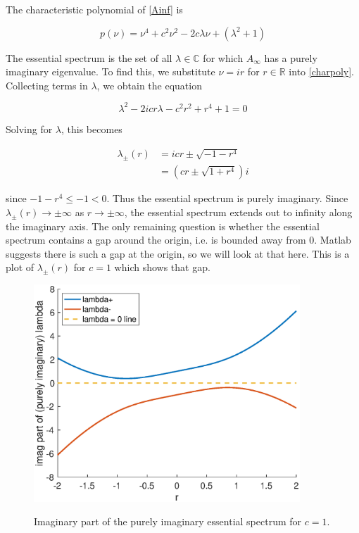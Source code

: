 \documentclass[12pt]{article}
\def\R{{\mathbb R}}
\def\C{{\mathbb C}}
\begin{document}
The characteristic polynomial of \eqref{Ainf} is

\begin{equation}\label{charpoly}
p(\nu) = \nu^4 + c^2 \nu^2 - 2 c \lambda \nu + (\lambda^2 + 1) 
\end{equation} 

The essential spectrum is the set of all $\lambda \in \C$ for which $A_\infty$ has a purely imaginary eigenvalue. To find this, we substitute $\nu = i r$ for $r \in \R$ into \eqref{charpoly}. Collecting terms in $\lambda$, we obtain the equation

\begin{equation}\label{fredholmborder}
\lambda^2 - 2 i c r \lambda - c^2 r^2  + r^4 + 1 = 0 
\end{equation} 

Solving for $\lambda$, this becomes

\begin{align*}
\lambda_\pm(r) &= i c r \pm \sqrt{-1 - r^4} \\
&= \left( c r \pm \sqrt{1 + r^4} \right) i
\end{align*}

since $-1 - r^4 \leq -1 < 0$. Thus the essential spectrum is purely imaginary. Since $\lambda_\pm(r) \rightarrow \pm \infty$ as $r \rightarrow \pm \infty$, the essential spectrum extends out to infinity along the imaginary axis. The only remaining question is whether the essential spectrum contains a gap around the origin, i.e. is bounded away from 0. Matlab suggests there is such a gap at the origin, so we will look at that here. This is a plot of $\lambda_\pm(r)$ for $c = 1$ which shows that gap.

\begin{figure}[H]
\centering
\includegraphics[width=10cm]{essspec1.eps}
\label{fig:essspec1}
\caption{Imaginary part of the purely imaginary essential spectrum for $c = 1$.}
\end{figure}
\end{document}
